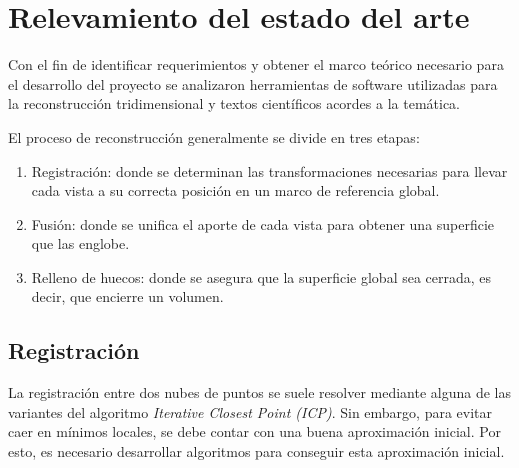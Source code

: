 \chapter{Relevamiento del estado del arte}
	Con el fin de identificar requerimientos y obtener el marco teórico
	necesario para el desarrollo del proyecto se analizaron herramientas de
	software utilizadas para la reconstrucción tridimensional y textos
	científicos acordes a la temática.

	El proceso de reconstrucción generalmente se divide en tres etapas:
	\begin{enumerate}
		\item Registración: donde se determinan las transformaciones necesarias
			para llevar cada vista a su correcta posición en un marco de
			referencia global.
		\item Fusión: donde se unifica el aporte de cada vista para obtener una
			superficie que las englobe.
		\item Relleno de huecos: donde se asegura que la superficie global sea
			cerrada, es decir, que encierre un volumen.
	\end{enumerate}




	\section{Registración}
		La registración entre dos nubes de puntos se suele resolver mediante
		alguna de las variantes del algoritmo \emph{Iterative Closest Point (ICP)}.
		Sin embargo, para evitar caer en mínimos locales,
		se debe contar con una buena aproximación inicial.
		Por esto, es necesario desarrollar algoritmos para conseguir esta
		aproximación inicial.\cite{7271006}



